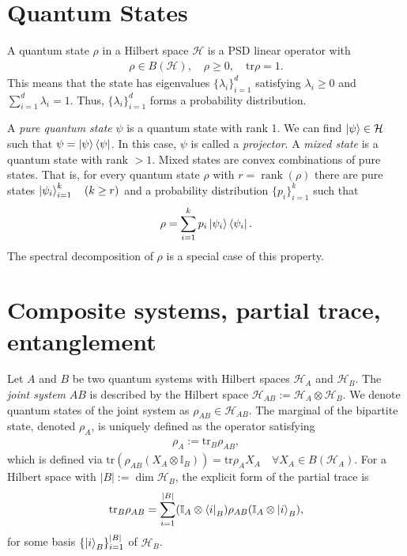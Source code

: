 \documentclass[10pt,oneside,longbibliography]{report}
\DeclareMathOperator{\rank}{rank}
\begin{document}
\section{Quantum States}
A quantum state $\rho$ in a Hilbert space $\mathcal{H}$ is a PSD linear operator with
\begin{align}
    \rho \in B(\mathcal{H}), \quad \rho \geq 0, \quad \text{tr}\rho =1.
\end{align}
This means that the state has eigenvalues $\{\lambda_i\}_{i=1}^d$ satisfying $\lambda_i\geq 0$ and $\sum_{i=1}^d \lambda_i =1$. Thus, $\{\lambda_i\}_{i=1}^d$ forms a probability distribution. 

A \textit{pure quantum state} $\psi$ is a quantum state with rank 1. We can find $\ket{\psi}\in \mathcal{H}$ such that $\psi =\ket{\psi}\bra{\psi}$. In this case, $\psi$ is called a \textit{projector}. A \textit{mixed state} is a quantum state with rank $>1$. Mixed states are convex combinations of pure states. That is, for every quantum state $\rho$ with $r=\rank(\rho)$ there are pure states $\ket{\psi_i}_{i=1}^k \quad (k\geq r)$ and a probability distribution $\{p_i\}_{i=1}^k$ such that 
\begin{align}
    \rho=\sum_{i=1}^k p_i \ket{\psi_i}\bra{\psi_i}.
\end{align}
The spectral decomposition of $\rho$ is a special case of this property. 
\section{Composite systems, partial trace, entanglement}
Let $A$ and $B$ be two quantum systems with Hilbert spaces $\mathcal{H}_A$ and $\mathcal{H}_B$. The \textit{joint system} $AB$ is described by the Hilbert space $\mathcal{H}_{AB}:=\mathcal{H}_A \otimes \mathcal{H}_B$. We denote quantum states of the joint system as $\rho_{AB}\in \mathcal{H}_{AB}$. The marginal of the bipartite state, denoted $\rho_A$, is uniquely defined as the operator satisfying
\begin{align}
    \rho_{A}:=\text{tr}_B\rho_{AB}, 
\end{align}
which is defined via $\text{tr}(\rho_{AB}(X_{A}\otimes \mathbb{I}_B))=\text{tr}\rho_A X_A \quad \forall X_A \in B(\mathcal{H}_A)$. For a Hilbert space with $|B|:=\dim\mathcal{H}_B$, the explicit form of the partial trace is
\begin{align}
    \text{tr}_B \rho_{AB}=\sum_{i=1}^{|B|}(\mathbb{I}_A \otimes \bra{i}_B)\rho_{AB} (\mathbb{I}_A\otimes \ket{i}_B),
\end{align}
for some basis $\{\ket{i}_B\}_{i=1}^{|B|}$ of $\mathcal{H}_B$. 
\end{document}
